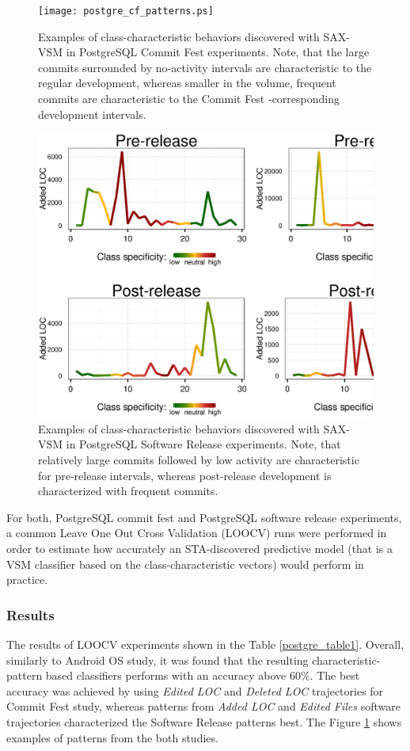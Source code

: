 \begin{figure}[h!]
   \centering
   \texttt{[image: postgre\_cf\_patterns.ps]}
   \caption{Examples of class-characteristic behaviors discovered with SAX-VSM in PostgreSQL Commit Fest experiments. Note, that the large commits surrounded by no-activity intervals are characteristic to the regular development, whereas smaller in the volume, frequent commits are characteristic to the Commit Fest -corresponding development intervals. }
   \label{fig:postgre_cf_patterns}   
   \includegraphics[width=145mm]{figures/postgre_release_patterns.ps}
   \caption{Examples of class-characteristic behaviors discovered with SAX-VSM in PostgreSQL Software Release experiments. Note, that relatively large commits followed by low activity are characteristic for pre-release intervals, whereas post-release development is characterized with frequent commits.}
   \label{fig:postgre_release_patterns}
\end{figure}

For both, PostgreSQL commit fest and PostgreSQL software release experiments, a common Leave One Out Cross Validation (LOOCV) \cite{citeulike:11275990} runs were performed in order to estimate how accurately an STA-discovered predictive model (that is a VSM classifier based on the class-characteristic vectors) would perform in practice.

\subsubsection{Results}
The results of LOOCV experiments shown in the Table \ref{postgre_table1}. Overall, similarly to Android OS study, it was found that the resulting characteristic-pattern based classifiers performs with an accuracy above 60\%. The best accuracy was achieved by using \textit{Edited LOC} and \textit{Deleted LOC} trajectories for Commit Fest study, whereas patterns from \textit{Added LOC} and \textit{Edited Files} software trajectories characterized the Software Release patterns best. The Figure \ref{fig:postgre_release_patterns} shows examples of patterns from the both studies.

